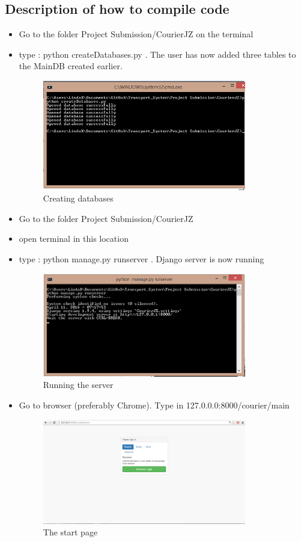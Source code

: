 \documentclass[paper=a4, fontsize=11pt]{scrartcl} %
\numberwithin{equation}{section} %
\numberwithin{figure}{section} %
\numberwithin{table}{section} %
\begin{document}
\subsection{Description of how to compile code}
\begin{itemize}
\item Go to the folder Project Submission/CourierJZ on the terminal
\item type : python createDatabases.py . The user has now added three tables to the MainDB created earlier.

\begin{figure}[hbt!]
\centering
\includegraphics[width=3.5in]{pictures/createDbTerminal.png}
\caption{Creating databases}
\label{DbCreation}
\end{figure}

\item Go to the folder Project Submission/CourierJZ
\item open terminal in this location
\item type : python manage.py runserver . Django server is now running

\begin{figure}[hbt!]
\centering
\includegraphics[width=3.5in]{pictures/runserver.png}
\caption{Running the server}
\label{Server}
\end{figure}

\item Go to browser (preferably Chrome). Type in 127.0.0.0:8000/courier/main
\begin{figure}[hbt!]
\centering
\includegraphics[width=3.5in]{pictures/mainpage.png}
\caption{The start page}
\label{StartMain}
\end{figure}


 

\end{itemize}
\end{document}
